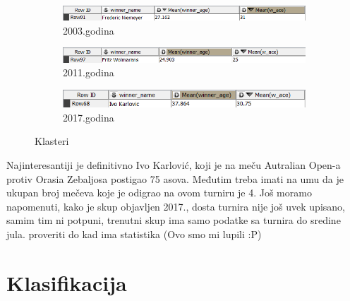 \documentclass[a4paper]{article}
\begin{document}
\begin{figure}[H]
	\begin{subfigure}[h]{\textwidth}
		\begin{center}
			\includegraphics[scale=0.40]{Klasterovanje/FredericNiemeyer2003Outlier.png}
		\end{center}
		\caption{2003.godina}
		\label{fig:Autlajer2003}
	\end{subfigure}
	
	\vspace{0.5cm}
	\begin{subfigure}[h]{\textwidth}
		\begin{center}
			\includegraphics[scale=0.40]{Klasterovanje/FritzWolmarans2011Outlier.png}
		\end{center}
		\caption{2011.godina}
		\label{fig:Autlajer2011}
	\end{subfigure}
	
	\vspace{0.5cm}
	\begin{subfigure}[h]{\textwidth}
		\begin{center}
			\includegraphics[scale=0.40]{Klasterovanje/IvoKarlovic2017Outlier.png}
		\end{center}
		\caption{2017.godina}
		\label{fig:Autlajer2011}
	\end{subfigure}
	
	\caption{Klasteri}
	\label{fig:IgraciAutlajeri}
\end{figure} 

Najinteresantiji je definitivno Ivo Karlović, koji je na meču Autralian Open-a protiv Orasia Zebaljosa postigao 75 asova. Međutim treba imati na umu da je ukupan broj mečeva koje je odigrao na ovom turniru je 4. Još moramo napomenuti, kako je skup objavljen 2017., dosta turnira nije još uvek upisano, samim tim ni potpuni, trenutni skup ima samo podatke sa turnira do sredine jula. {\color{red} proveriti do kad ima statistika (Ovo smo mi lupili :P)}  

\section{Klasifikacija}
\end{document}
